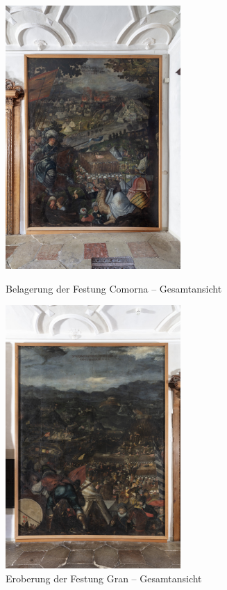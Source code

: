 \documentclass[
  a4paper,
]{book}
\begin{document}
\begin{figure}
\includegraphics[height=10cm]{images/fmd10005850a.jpg}

\caption{Belagerung der Festung Comorna – Gesamtansicht}
\label{fig:{images/fmd10005850a.jpg}}

\clearpage

\centering

\includegraphics[height=10cm]{images/fmd10005848a.jpg}

\caption{Eroberung der Festung Gran – Gesamtansicht}
\label{fig:{images/fmd10005848a.jpg}}

\clearpage

\centering


\end{figure}
\end{document}
